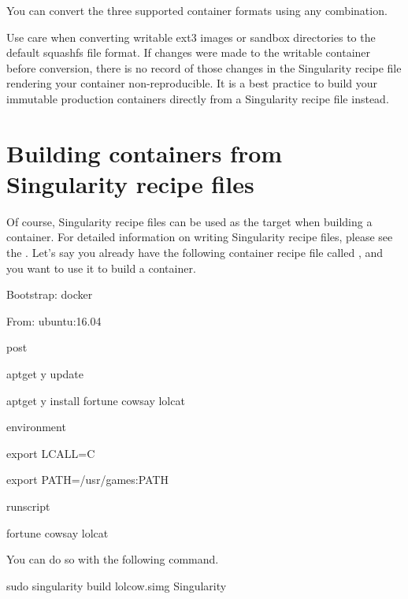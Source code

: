 \documentclass[letterpaper,10pt,english]{sphinxmanual}
\begin{document}
You can convert the three supported container formats using any
combination.

Use care when converting writable ext3 images or sandbox directories
to the default squashfs file format. If changes were made to the
writable container before conversion, there is no record of those
changes in the Singularity recipe file rendering your container
non-reproducible. It is a best practice to build your immutable
production containers directly from a Singularity recipe file instead.


\section{Building containers from Singularity recipe files}
\label{\detokenize{build_a_container:building-containers-from-singularity-recipe-files}}
Of course, Singularity recipe files can be used as the target when
building a container. For detailed information on writing Singularity
recipe files, please see the .
Let’s say you already have the following container recipe file called 
, and you want to use it to build a container.

%
\begin{sphinxVerbatim}[commandchars=\\\{\}]
Bootstrap: docker

From: ubuntu:16.04


\PYGZpc{}post

    apt\PYGZhy{}get \PYGZhy{}y update

    apt\PYGZhy{}get \PYGZhy{}y install fortune cowsay lolcat


\PYGZpc{}environment

    export LC\PYGZus{}ALL=C

    export PATH=/usr/games:\PYGZdl{}PATH


\PYGZpc{}runscript

    fortune \textbar{} cowsay \textbar{} lolcat
\end{sphinxVerbatim}

You can do so with the following command.

%
\begin{sphinxVerbatim}[commandchars=\\\{\}]
\PYGZdl{} sudo singularity build lolcow.simg Singularity
\end{sphinxVerbatim}
\end{document}
